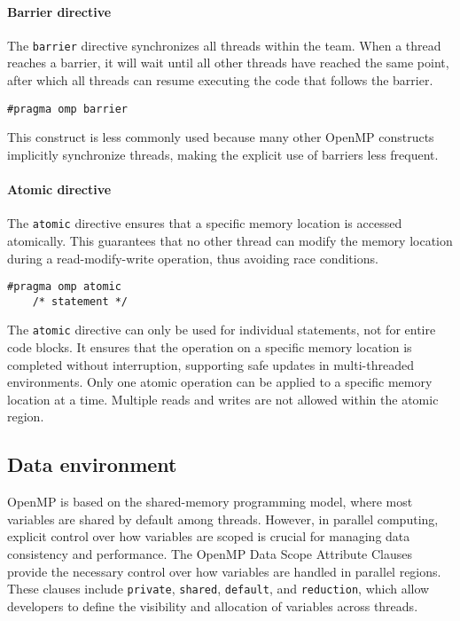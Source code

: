 \paragraph*{Barrier directive}
The \texttt{barrier} directive synchronizes all threads within the team. 
When a thread reaches a barrier, it will wait until all other threads have reached the same point, after which all threads can resume executing the code that follows the barrier.
\begin{lstlisting}[style=C]
#pragma omp barrier
\end{lstlisting}
This construct is less commonly used because many other OpenMP constructs implicitly synchronize threads, making the explicit use of barriers less frequent.

\paragraph*{Atomic directive}
The \texttt{atomic} directive ensures that a specific memory location is accessed atomically. 
This guarantees that no other thread can modify the memory location during a read-modify-write operation, thus avoiding race conditions.
\begin{lstlisting}[style=C]
#pragma omp atomic
    /* statement */
\end{lstlisting}
The \texttt{atomic} directive can only be used for individual statements, not for entire code blocks. 
It ensures that the operation on a specific memory location is completed without interruption, supporting safe updates in multi-threaded environments.
\noindent Only one atomic operation can be applied to a specific memory location at a time. 
Multiple reads and writes are not allowed within the atomic region.

\subsection{Data environment}
OpenMP is based on the shared-memory programming model, where most variables are shared by default among threads. 
However, in parallel computing, explicit control over how variables are scoped is crucial for managing data consistency and performance. 
The OpenMP Data Scope Attribute Clauses provide the necessary control over how variables are handled in parallel regions. 
These clauses include \texttt{private}, \texttt{shared}, \texttt{default}, and \texttt{reduction}, which allow developers to define the visibility and allocation of variables across threads.

